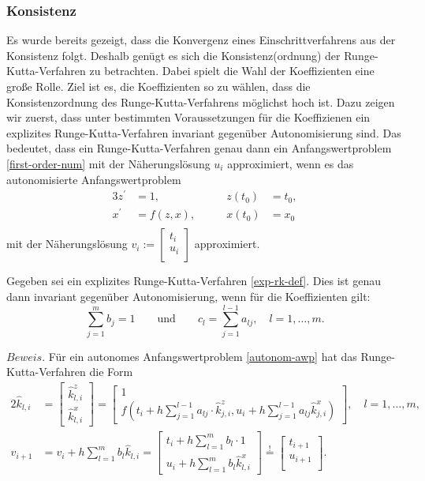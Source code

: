 \subsubsection{Konsistenz}
Es wurde bereits gezeigt, dass die Konvergenz eines Einschrittverfahrens aus der Konsistenz folgt. Deshalb genügt es
sich die Konsistenz(ordnung) der Runge-Kutta-Verfahren zu betrachten. Dabei spielt die Wahl der Koeffizienten eine
große Rolle. Ziel ist es, die Koeffizienten so zu wählen, dass die Konsistenzordnung des Runge-Kutta-Verfahrens
möglichst hoch ist. Dazu zeigen wir zuerst, dass unter bestimmten Voraussetzungen für die Koeffizienen ein explizites
Runge-Kutta-Verfahren invariant gegenüber Autonomisierung sind. Das bedeutet, dass ein Runge-Kutta-Verfahren genau dann
ein Anfangswertproblem \eqref{first-order-num} mit der Näherungslösung $u_i$ approximiert, wenn es das
autonomisierte Anfangswertproblem
\begin{alignat}{3}
    \label{autonom-awp}
    z^{\prime} &= 1, \qquad &z(t_0) &= t_0, \\
    x^{\prime} &= f(z,x),\qquad  &x(t_0) &= x_0 \nonumber \\ \nonumber
\end{alignat}
mit der Näherungslösung $v_i := \left[ \begin{matrix}
                                           t_i\\
                                           u_i\\
\end{matrix} \right]$
approximiert.
\begin{satz}
    Gegeben sei ein explizites Runge-Kutta-Verfahren \eqref{exp-rk-def}. Dies ist genau dann invariant gegenüber
    Autonomisierung, wenn für die Koeffizienten gilt:
    \[
        \sum_{j=1}^{m} b_j = 1 \qquad \text{und} \qquad c_l=\sum_{j=1}^{l-1} a_{lj}, \quad l = 1, \dots, m.
    \]
\end{satz}
$Beweis.$ Für ein autonomes Anfangswertproblem \eqref{autonom-awp} hat das Runge-Kutta-Verfahren die Form
\begin{alignat*}{2}
    \hat{k}_{l,i} &= \begin{bmatrix} \hat{k}^{z}_{l,i} \\ \hat{k}^{x}_{l,i} \end{bmatrix}
    = \begin{bmatrix} 1 \\
    f\left( t_i + h \sum\limits_{j=1}^{l-1} a_{lj} \cdot \hat{k}^{z}_{j,i},
    u_i + h \sum\limits_{j=1}^{l-1} a_{lj} \hat{k}^{x}_{j,i} \right)
    \end{bmatrix},  \quad l=1,\dots,m, \\
    v_{i+1} &= v_i + h \sum\limits_{l=1}^{m} b_l \hat{k}_{l,i} =
    \begin{bmatrix}
         t_i + h \sum\limits_{l=1}^{m} b_l \cdot 1\\
         u_i + h \sum\limits_{l=1}^{m} b_l \hat{k}^{x}_{l,i}
    \end{bmatrix}
    \overset{!}{=}\begin{bmatrix}t_{i+1}\\u_{i+1}\\\end{bmatrix}.
\end{alignat*}
